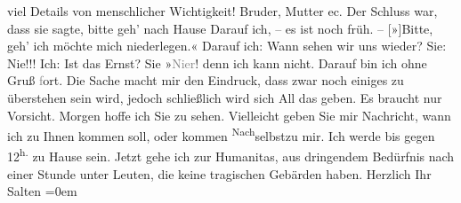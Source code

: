 \begin{ledgroupsized}[t]{13cm}
               viel Details von menschlicher Wichtigkeit! Bruder, Mutter ec. \pend
           \pstart
           Der Schluss war, dass sie
               sagte, bitte geh’ nach Hause{\dotstwo} Darauf ich, – es ist noch
               früh. – {[}»{]}Bitte, geh’ ich möchte mich niederlegen.« Darauf ich:
               Wann sehen wir uns wieder? Sie: Nie!!! Ich: Ist das Ernst? Sie »\textcolor{gray}{Ni{\geminationm}er}!
                  {\pb}denn ich kann nicht.
               Darauf bin ich ohne Gruß \textcolor{gray}{f}ort. \pend
           \pstart
           Die Sache macht mir den Eindruck, dass zwar noch einiges zu überstehen sein wird,
               jedoch schließlich wird sich All das geben. Es braucht nur Vorsicht. \pend
           \pstart
           Morgen hoffe ich Sie zu sehen. Vielleicht geben Sie mir Nachricht, wann
               ich zu Ihnen kommen soll,  oder kommen \substVorne{}\textsuperscript{Nach}\substDazwischen{}selbst\substHinten{}{ }{\pb}zu mir. Ich werde bis gegen
                  12\textsuperscript{h.} zu Hause sein. \pend
           \pstart
           Jetzt gehe ich zur Humanitas, aus dringendem Bedürfnis
               nach einer Stunde unter Leuten, die keine tragischen Gebärden haben. \pend
           \pstart
           Herzlich Ihr {\\[\baselineskip]}\spacefill\mbox{Salten}\pend
           \leftskip=0em{}
         
         \endnumbering{}\end{ledgroupsized}\begin{anhang}\end{anhang}\newcommand{\dateiname}{L03149}\newcommand{\titel}{Felix Salten an Arthur Schnitzler, [26. 1. 1895]}\newcommand{\editorInnen}{Martin Anton Müller und Laura Untner}
      